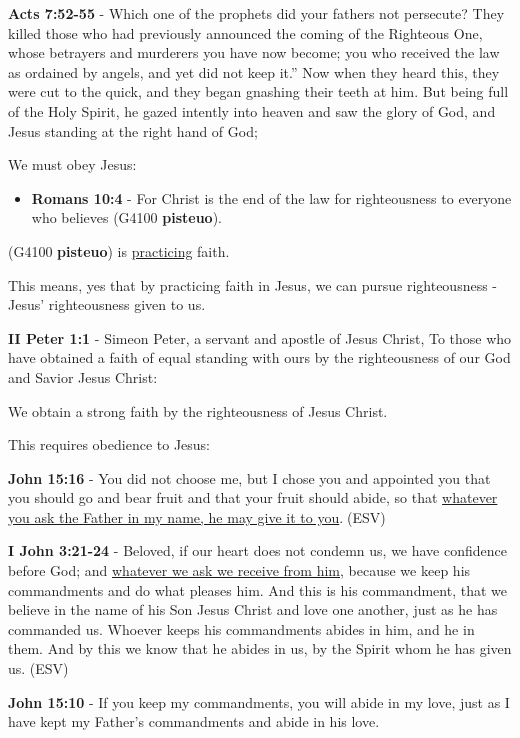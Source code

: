 \documentclass[11pt]{article}
\begin{document}
\textbf{Acts 7:52-55} - Which one of the prophets did your fathers not persecute? They killed those who had previously announced the coming of the Righteous One, whose betrayers and murderers you have now become; you who received the law as ordained by angels, and yet did not keep it.” Now when they heard this, they were cut to the quick, and they began gnashing their teeth at him.  But being full of the Holy Spirit, he gazed intently into heaven and saw the glory of God, and Jesus standing at the right hand of God;

We must obey Jesus:

\begin{itemize}
\item \textbf{Romans 10:4} - For Christ is the end of the law for righteousness to everyone who believes (G4100 \textbf{pisteuo}).
\end{itemize}

(G4100 \textbf{pisteuo}) is \uline{practicing} faith.

This means, yes that by practicing faith in Jesus, we can pursue righteousness - Jesus' righteousness given to us.

\textbf{II Peter 1:1} - Simeon Peter, a servant and apostle of Jesus Christ, To those who have obtained a faith of equal standing with ours by the righteousness of our God and Savior Jesus Christ:

We obtain a strong faith by the righteousness of Jesus Christ.

This requires obedience to Jesus:

\textbf{John 15:16} - You did not choose me, but I chose you and appointed you that you should go and bear fruit and that your fruit should abide, so that \uline{whatever you ask the Father in my name, he may give it to you}.􀀂(ESV)

\textbf{I John 3:21-24} - Beloved, if our heart does not condemn us, we have confidence before God; and \uline{whatever we ask we receive from him}, because we keep his commandments and do what pleases him. And this is his commandment, that we believe in the name of his Son Jesus Christ and love one another, just as he has commanded us. Whoever keeps his commandments abides in him, and he in them. And by this we know that he abides in us, by the Spirit whom he has given us. (ESV)

\textbf{John 15:10} - If you keep my commandments, you will abide in my love, just as I have kept my Father's commandments and abide in his love.
\end{document}
